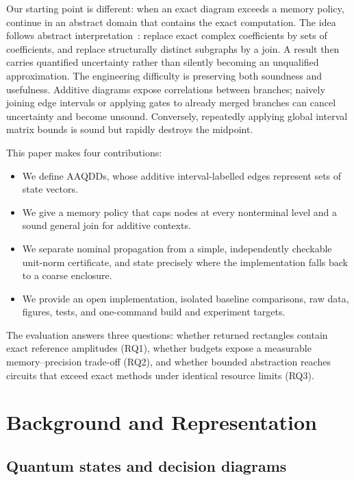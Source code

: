 \documentclass[sigconf,nonacm]{acmart}
\newcommand{\aaqdd}{AAQDD}
\begin{document}
Our starting point is different: when an exact diagram exceeds a memory policy, continue in
an abstract domain that contains the exact computation. The idea follows abstract
interpretation~\cite{cousot1977abstract}: replace exact complex coefficients by sets of
coefficients, and replace structurally distinct subgraphs by a join. A result then carries
quantified uncertainty rather than silently becoming an unqualified approximation. The
engineering difficulty is preserving both soundness and usefulness. Additive diagrams expose
correlations between branches; naively joining edge intervals or applying gates to already
merged branches can cancel uncertainty and become unsound. Conversely, repeatedly applying
global interval matrix bounds is sound but rapidly destroys the midpoint.

This paper makes four contributions:

\begin{itemize}
  \item We define \aaqdd{}s, whose additive interval-labelled edges represent sets of
  state vectors.
  \item We give a memory policy that caps nodes at every nonterminal level and a sound general
  join for additive contexts.
  \item We separate nominal propagation from a simple, independently checkable unit-norm
  certificate, and state precisely where the implementation falls back to a coarse enclosure.
  \item We provide an open implementation, isolated baseline comparisons, raw data, figures,
  tests, and one-command build and experiment targets.
\end{itemize}

The evaluation answers three questions: whether returned rectangles contain exact reference
amplitudes (RQ1), whether budgets expose a measurable memory--precision trade-off (RQ2), and
whether bounded abstraction reaches circuits that exceed exact methods under identical
resource limits (RQ3).

\section{Background and Representation}

\subsection{Quantum states and decision diagrams}
\end{document}
